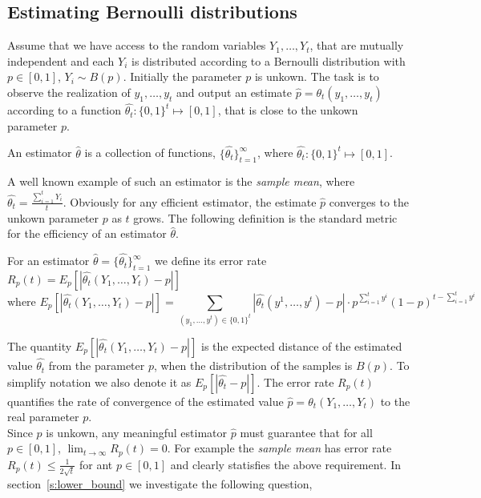 
\subsection{Estimating Bernoulli distributions}

Assume that we have access to the random variables $Y_1,\ldots,Y_t$, that are
mutually independent and each
$Y_i$ is distributed according to a Bernoulli distribution with $p \in [0,1]$,
$Y_i\sim B(p)$.  Initially the parameter $p$ is unkown. The task is to observe
the realization of $y_1,\ldots,y_t$ and output an estimate
$\hat{p}=\theta_t(y_1,\ldots,y_t)$ according to a function $\hat{\theta_t}:
\{0,1\}^t\mapsto [0,1]$, that is close to the unkown parameter $p$.

\begin{definition}
  An estimator $\hat{\theta}$ is a collection of functions,
  $\{\hat{\theta_t}\}_{t=1}^{\infty}$, where
  $\hat{\theta_t}: \{0,1\}^t\mapsto [0,1]$.
\end{definition}

A well known example of such an estimator is the
\emph{sample mean}, where $\hat{\theta_t}=\frac{\sum_{i=1}^tY_i}{t}$.
\noindent Obviously for any efficient estimator, the estimate $\hat{p}$
converges to the unkown parameter $p$ as $t$ grows. The following definition is
the standard metric for the efficiency of an estimator $\hat{\theta}$.

\begin{definition}
  For an estimator $\hat{\theta}
  =\{\hat{\theta_t}\}_{t=1}^\infty$ we define its  error rate $R_p(t) =
  E_p[|\hat{\theta_t}(Y_1,\ldots,Y_t) - p|]$ \[\text{where
    }E_p[|\hat{\theta_t}(Y_1,\ldots,Y_t) - p|]= \sum_{(y_1,\ldots,y^t)\in
      \{0,1\}^t}|\hat{\theta_t}(y^1,\ldots,y^t) -p| \cdot
    p^{\sum_{i=1}^ty^i}(1-p)^{t-\sum_{i=1}^ty^i}\]
\end{definition}

The quantity $E_p[|\hat{\theta_t}(Y_1,\ldots,Y_t) - p|]$ is the expected distance
of the estimated value $\hat{\theta_t}$ from the parameter $p$, when the
distribution of the samples is $B(p)$. To simplify notation we also denote it
as $E_p[|\hat{\theta_t} - p|]$. The error rate $R_p(t)$ quantifies the rate of
convergence of the estimated value $\hat{p} =\theta_t(Y_1,\ldots,Y_t)$ to the
real parameter $p$. \\ Since $p$ is unkown, any meaningful estimator $\hat{p}$
must guarantee that for all $p \in [0,1]$, $\lim_{t \rightarrow \infty}
R_p(t)=0$. For example the \emph{sample mean} has error rate $R_p(t) \leq
\frac{1}{2\sqrt{t}}$ for ant $p \in [0,1]$ and clearly statisfies the above
requirement. In section~\ref{s:lower_bound} we investigate the following question,


